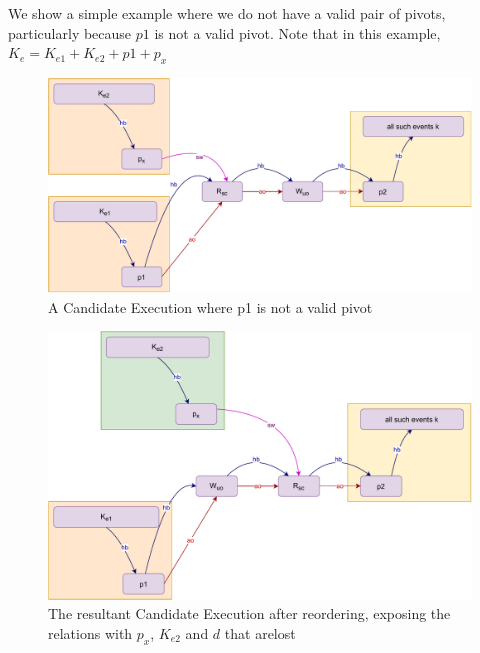     We show a simple example where we do not have a valid pair of pivots, particularly because $p1$ is not a valid pivot. Note that in this example, $K_e = K_{e1} + K_{e2} + p1 + p_x$
    \begin{figure}[H]
        \centering
        \includegraphics[scale=0.6]{InstructionReordering/ValidReorderingProof/ProofParts/Part1/part1(e).pdf}
        \caption{A Candidate Execution where p1 is not a valid pivot}
        \label{fig:my_label}
    \end{figure}
    
    \begin{figure}[H]
        \centering
        \includegraphics[scale=0.6]{InstructionReordering/ValidReorderingProof/ProofParts/Part1/part1(f).pdf}
        \caption{The resultant Candidate Execution after reordering, exposing the relations with $p_x$, $K_{e2}$ and $d$ that arelost}
        \label{fig:my_label}
    \end{figure}
        
